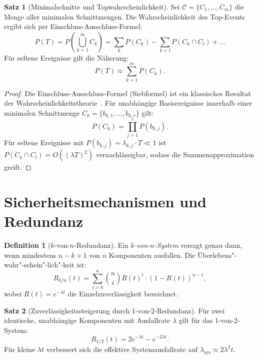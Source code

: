 ﻿\documentclass[a4paper,12pt]{article}
\theoremstyle{definition}
\newtheorem{definition}{Definition}
\newtheorem{satz}{Satz}
\begin{document}
\begin{satz}[Minimalschnitte und Topwahrscheinlichkeit]
\label{satz:fta}
  Sei $\mathcal{C} = \{C_1, \ldots, C_m\}$ die Menge aller minimalen
  Schnittmengen. Die Wahrscheinlichkeit des Top-Events ergibt sich
  per Einschluss-Ausschluss-Formel:
  \[
    P(T) = P\!\left(\bigcup_{k=1}^{m} C_k\right)
         = \sum_{k} P(C_k) - \sum_{k<l} P(C_k \cap C_l) + \ldots
  \]
  Für seltene Ereignisse gilt die Näherung:
  \[
    P(T) \approx \sum_{k=1}^{m} P(C_k).
  \]
\end{satz}

\begin{proof}
  Die Einschluss-Ausschluss-Formel (Siebformel) ist ein klassisches
  Resultat der Wahrscheinlichkeitstheorie~\cite{feller_1968}.
  Für unabhängige Basisereignisse innerhalb einer minimalen
  Schnittmenge $C_k = \{b_{k,1}, \ldots, b_{k,r}\}$ gilt:
  \[
    P(C_k) = \prod_{j=1}^{r} P(b_{k,j}).
  \]
  Für seltene Ereignisse mit $P(b_{k,j}) = \lambda_{k,j} \cdot T \ll 1$
  ist $P(C_k \cap C_l) = O((\lambda T)^2)$ vernachlässigbar,
  sodass die Summenapproximation greift.
\end{proof}

\section{Sicherheitsmechanismen und Redundanz}

\begin{definition}[$k$-von-$n$-Redundanz]
  Ein \emph{$k$-von-$n$-System} versagt genau dann, wenn mindestens
  $n - k + 1$ von $n$ Komponenten ausfallen. Die Überlebens"-wahr"-schein"-lich"-keit
  ist:
  \[
    R_{k/n}(t)
    = \sum_{i=k}^{n} \binom{n}{i} R(t)^i \cdot (1-R(t))^{n-i},
  \]
  wobei $R(t) = e^{-\lambda t}$ die Einzelzuverlässigkeit bezeichnet.
\end{definition}

\begin{satz}[Zuverlässigkeitssteigerung durch 1-von-2-Redundanz]
\label{satz:redundanz}
  Für zwei identische, unabhängige Komponenten mit Ausfallrate
  $\lambda$ gilt für das 1-von-2-System:
  \[
    R_{1/2}(t) = 2e^{-\lambda t} - e^{-2\lambda t}.
  \]
  Für kleine $\lambda t$ verbessert sich die effektive
  Systemausfallrate auf $\lambda_{\mathrm{sys}} \approx 2\lambda^2 t$.
\end{satz}
\end{document}
